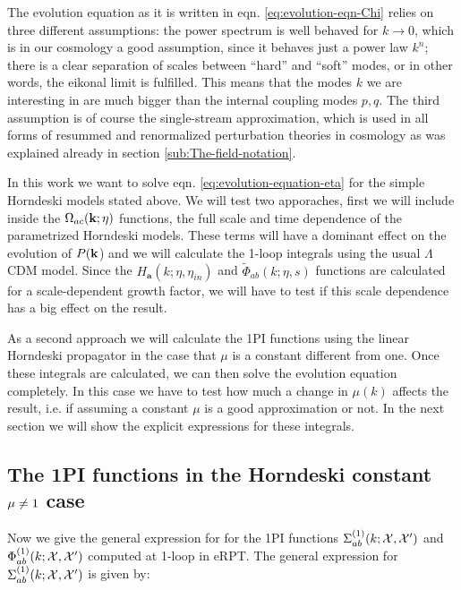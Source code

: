 The evolution equation as it is written in eqn. \ref{eq:evolution-eqn-Chi}
relies on three different assumptions: the power spectrum is well
behaved for $k\rightarrow0$, which is in our cosmology a good assumption,
since it behaves just a power law $k^{n}$; there is a clear separation
of scales between ``hard'' and ``soft'' modes, or in other words,
the eikonal limit is fulfilled. This means that the modes $k$ we
are interesting in are much bigger than the internal coupling modes
$p,q$. The third assumption is of course the single-stream approximation,
which is used in all forms of resummed and renormalized perturbation
theories in cosmology as was explained already in section \ref{sub:The-field-notation}.

In this work we want to solve eqn. \ref{eq:evolution-equation-eta}
for the simple Horndeski models stated above. We will test two apporaches,
first we will include inside the $\Omega_{ac}(\mathbf{k};\eta)$ functions, the
full scale and time dependence of the parametrized Horndeski models.
These terms will have a dominant effect on the evolution of $P(\mathbf{k}$)
and we will calculate the 1-loop integrals using the usual $\Lambda$CDM
model. Since the $H_{\mathbf{a}}(k;\eta,\eta_{in})$ and $\tilde{\Phi}_{ab}(k;\mathcal{\eta},s)$
functions are calculated for a scale-dependent growth factor, we will
have to test if this scale dependence has a big effect on the result.

As a second approach we will calculate the 1PI functions using the
linear Horndeski propagator in the case that $\mu$ is a constant
different from one. Once these integrals are calculated, we can then
solve the evolution equation completely. In this case we have to test
how much a change in $\mu(k)$ affects the result, i.e. if assuming
a constant $\mu$ is a good approximation or not. In the next section
we will show the explicit expressions for these integrals.


\subsection{The 1PI functions in the Horndeski constant $\mu\protect\neq1$ case}


Now we give the general expression for for the 1PI functions $\Sigma_{ab}^{(1)}(k;\mathcal{X},\mathcal{X}')$
and $\Phi_{ab}^{(1)}(k;\mathcal{X},\mathcal{X}')$ computed at 1-loop in eRPT.
The general expression for $\Sigma_{ab}^{(1)}(k;\mathcal{X},\mathcal{X}')$
is given by:

